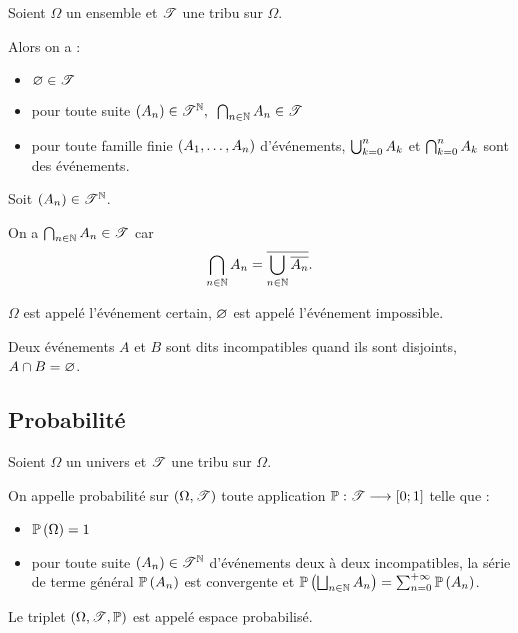\begin{prop}
Soient \(\Omega\) un ensemble et \(\mathscr{T}\) une tribu sur \(\Omega\).

Alors on a :

\begin{itemize}
    \item \(\varnothing\in\mathscr{T}\) \\
    \item pour toute suite \(\quantifs{\paren{A_n}\in\fami{T}^\N}\biginter_{n\in\N}A_n\in\fami{T}\) \\
    \item pour toute famille finie \(\left(A_1,\dots,A_n\right)\) d'événements, \(\bigcup_{k=0}^nA_k\) et \(\bigcap_{k=0}^nA_k\) sont des événements.
\end{itemize}
\end{prop}

\begin{dem}
Soit \(\left(A_n\right)\in\mathscr{T}^{\mathbb{N}}\).

On a \(\bigcap_{n\in\mathbb{N}}A_n\in\mathscr{T}\) car \[\bigcap_{n\in\mathbb{N}}A_n=\overline{\bigcup_{n\in\mathbb{N}}\overline{A_n}}.\]
\end{dem}

\begin{defi}
\(\Omega\) est appelé l'événement certain, \(\varnothing\) est appelé l'événement impossible.

Deux événements \(A\) et \(B\) sont dits incompatibles quand ils sont disjoints, \ie \(A\cap B=\varnothing\).
\end{defi}

\subsection{Probabilité}

\begin{defi}
Soient \(\Omega\) un univers et \(\mathscr{T}\) une tribu sur \(\Omega\).

On appelle probabilité sur \(\groupe{\Omega}[\fami{T}]\) toute application \(\mathbb{P}:\mathscr{T}\longrightarrow\left[0;1\right]\) telle que :

\begin{itemize}
    \item \(\mathbb{P}\left(\Omega\right)=1\) \\
    \item pour toute suite \(\left(A_n\right)\in\mathscr{T}^{\mathbb{N}}\) d'événements deux à deux incompatibles, la série de terme général \(\mathbb{P}\left(A_n\right)\) est convergente et \(\mathbb{P}\left(\bigsqcup_{n\in\mathbb{N}}A_n\right)=\sum_{n=0}^{+\infty}\mathbb{P}\left(A_n\right)\).
\end{itemize}

Le triplet \(\anneau{\Omega}[\fami{T}][\prem]\) est appelé espace probabilisé.
\end{defi}

